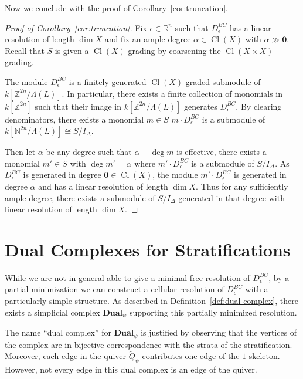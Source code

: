 \documentclass{amsart}
\newcommand{\NN}{\mathbb{N}}
\newcommand{\ZZ}{\mathbb{Z}}
\newcommand{\RR}{\mathbb{R}}
\newcommand{\field}{k}
\newcommand{\Dual}{\mathbf{Dual}}
\newcommand{\Mepsilon}{D^{BC}_{\epsilon}}
\DeclareMathOperator{\Cl}{Cl}
\theoremstyle{remark}
\begin{document}
Now we conclude with the proof of Corollary~\ref{cor:truncation}.
\begin{proof}[Proof of Corollary~\ref{cor:truncation}]
  Fix $\epsilon\in \RR^n$ such that $\Mepsilon$ has a linear resolution of length $\dim X$
  and fix an ample degree $\alpha\in \Cl(X)$ with $\alpha\gg \bm{0}$.
  Recall that $S$ is given a $\Cl(X)$-grading by coarsening the $\Cl(X\times X)$ grading.

  The module $\Mepsilon$ is a finitely generated $\Cl(X)$-graded submodule of $\field[\ZZ^{2n}/\Lambda(L)]$.
  In particular, there exists a finite collection of monomials in $\field[\ZZ^{2n}]$ such that
  their image in $\field[\ZZ^{2n}/\Lambda(L)]$ generates $\Mepsilon$.
  By clearing denominators, there exists a monomial $m\in S$ $m\cdot \Mepsilon$
  is a submodule of $\field[\NN^{2n}/\Lambda(L)]\cong S/I_{\Delta}$.

  Then let $\alpha$ be any degree such that $\alpha-\deg m$ is effective,
  there exists a monomial $m'\in S$ with $\deg m' = \alpha$ where
  $m'\cdot \Mepsilon$ is a submodule of $S/I_{\Delta}$. As $\Mepsilon$ is generated
  in degree $\bm{0}\in \Cl(X)$, the module $m'\cdot \Mepsilon$ is generated
  in degree $\alpha$ and has a linear resolution of length $\dim X$.
  Thus for any sufficiently ample degree, there exists a submodule of $S/I_{\Delta}$
  generated in that degree with linear resolution of length $\dim X$.
\end{proof}


\section{Dual Complexes for Stratifications}
\label{sec:dual}

While we are not in general able to give a minimal free resolution of $\Mepsilon$, by a partial minimization we can construct a cellular resolution of $\Mepsilon$ with a particularly simple structure. As described in Definition~\ref{def:dual-complex}, there exists a simplicial complex $\Dual_\psi$ supporting this partially minimized resolution.

The name ``dual complex'' for $\Dual_\psi$ is justified by observing that the vertices of the complex are in bijective correspondence with the strata of the stratification. Moreover, each edge in the quiver $\widetilde{Q}_\psi$ contributes one edge of the $1$-skeleton. However, not every edge in this dual complex is an edge of the quiver.
\end{document}

